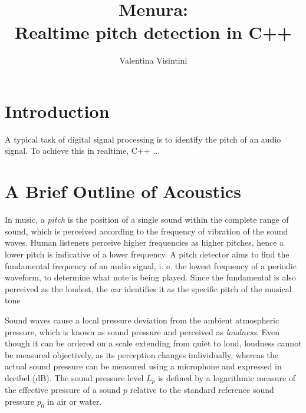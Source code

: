 \documentclass[runningheads,a4paper]{llncs}
\begin{document}
\mainmatter  %

\title{Menura: \\ Realtime pitch detection in C++}


%
\author{Valentina Visintini}
%


\maketitle


\section{Introduction}
A typical task of digital signal processing is to identify the pitch of an audio signal. To achieve this in realtime, C++ ...


\section{A Brief Outline of Acoustics}
In music, a \textit{pitch} is the position of a single sound within the complete range of sound, which is perceived according to the frequency of vibration of the sound waves. Human listeners perceive higher frequencies as higher pitches, hence a lower pitch is indicative of a lower frequency.
A pitch detector aims to find the fundamental frequency of an audio signal, i. e. the lowest frequency of a periodic waveform, to determine what note is being played. Since the fundamental is also perceived as the loudest, the ear identifies it as the specific pitch of the musical tone

Sound waves cause a local pressure deviation from the ambient atmospheric pressure, which is known as sound pressure and perceived as \textit{loudness}. Even though it can be ordered on a scale extending from quiet to loud, loudness cannot be measured objectively, as its perception changes individually, whereas the actual sound pressure can be measured using a microphone and expressed in decibel (dB). The sound pressure level $L_p$ is defined by a logarithmic measure of the effective pressure of a sound $p$ relative to the standard reference sound pressure $p_0$ in air or water. 
\end{document}
